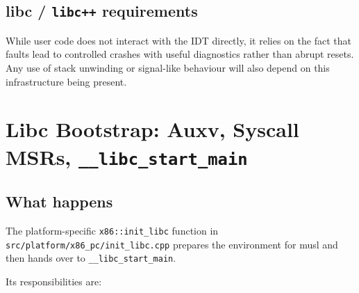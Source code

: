 \documentclass[a4paper,11pt]{article}
\begin{document}
\subsection{libc / \texorpdfstring{\texttt{libc++}}{libc++} requirements}

While user code does not interact with the IDT directly, it relies on
the fact that faults lead to controlled crashes with useful diagnostics
rather than abrupt resets. Any use of stack unwinding or signal-like
behaviour will also depend on this infrastructure being present.

\section{Libc Bootstrap: Auxv, Syscall MSRs, \texorpdfstring{\texttt{\_\_libc\_start\_main}}{__libc\_start\_main}}

\subsection{What happens}

The platform-specific \texttt{x86::init\_libc} function in
\texttt{src/platform/x86\_pc/init\_libc.cpp} prepares the environment
for musl and then hands over to \texttt{\_\_libc\_start\_main}.

Its responsibilities are:
\end{document}
